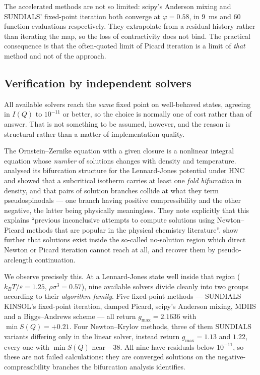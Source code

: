 \documentclass[11pt,a4paper]{article}
\begin{document}
The accelerated methods are not so limited: scipy's Anderson mixing and
SUNDIALS' fixed-point iteration both converge at $\varphi = 0.58$, in
$9$~ms and $60$ function evaluations respectively. They extrapolate from a
residual history rather than iterating the map, so the loss of contractivity
does not bind. The practical consequence is that the often-quoted limit of
Picard iteration is a limit of \emph{that} method and not of the approach.

\subsection{Verification by independent solvers}
\label{sec:verification}

All available solvers reach the \emph{same} fixed point on well-behaved
states, agreeing in $I(Q)$ to $10^{-11}$ or better, so the choice is normally
one of cost rather than of answer. That is not something to be assumed,
however, and the reason is structural rather than a matter of implementation
quality.

The Ornstein--Zernike equation with a given closure is a nonlinear integral
equation whose \emph{number} of solutions changes with density and
temperature. \citet{Beardmore2007} analysed its bifurcation
structure for the Lennard-Jones potential under HNC and showed that a
subcritical isotherm carries at least one \emph{fold bifurcation} in density,
and that pairs of solution branches collide at what they term pseudospinodals
--- one branch having positive compressibility and the other negative, the
latter being physically meaningless. They note explicitly that this explains
``previous inconclusive attempts to compute solutions using Newton--Picard
methods that are popular in the physical chemistry literature''.
\citet{Peplow2006} show further that solutions exist inside the
so-called no-solution region which direct Newton or Picard iteration cannot
reach at all, and recover them by pseudo-arclength continuation.

We observe precisely this. At a Lennard-Jones state well inside that region
($k_BT/\varepsilon = 1.25$, $\rho\sigma^3 = 0.57$), nine available solvers
divide cleanly into two groups according to their \emph{algorithm family}.
Five fixed-point methods --- SUNDIALS KINSOL's fixed-point iteration, damped
Picard, scipy's Anderson mixing, MDIIS and a Biggs--Andrews scheme --- all
return $g_{\max} = 2.1636$ with $\min S(Q) = +0.21$. Four Newton--Krylov
methods, three of them SUNDIALS variants differing only in the linear solver,
instead return $g_{\max} = 1.13$ and $1.22$, every one with $\min S(Q)$ near
$-38$. All nine have residuals below $10^{-11}$, so these are not failed
calculations: they are converged solutions on the negative-compressibility
branches the bifurcation analysis identifies.
\end{document}
